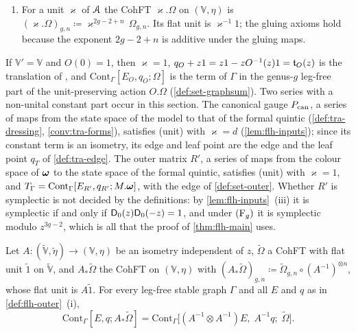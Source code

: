 \begin{defn}
\begin{enumerate}
\[
\text{(unit)}\qquad O_0^{-1}1'=\varkappa^{-1}1\quad\text{for a unit }\varkappa\text{ of }\cA .
\]
The edge and the leaf point of $O$ are
\[
E_O(\psi,\psi')\coloneqq\frac{\eta^{-1}-\bigl(O^{-1}(\psi)\otimes O^{-1}(\psi')\bigr)\eta'^{-1}}{\psi+\psi'},\qquad q_O(z)\coloneqq O^{-1}(z)(-z1'),
\]
where $\eta^{-1}\in\mathbb V\otimes\mathbb V$ and $\eta'^{-1}\in\mathbb V'\otimes\mathbb V'$ are the inverse bivectors. By symplecticity the numerator vanishes at $\psi'=-\psi$, so $E_O$ is a symmetric power series in $\psi,\psi'$ \cite[Rem.~2.1 and (6)]{PPZ15}; by (unit), $q_O\in-z\varkappa^{-1}1+z^2\mathbb V\fps{z}$.
\item For a unit $\varkappa$ of $\mathcal{A}$ the CohFT $\varkappa.\Omega$ on $(\mathbb V,\eta)$ is $(\varkappa.\Omega)_{g,n}\coloneqq\varkappa^{2g-2+n}\,\Omega_{g,n}$. Its flat unit is $\varkappa^{-1}1$; the gluing axioms hold because the exponent $2g-2+n$ is additive under the gluing maps.
\end{enumerate}
\end{defn}

If $\mathbb V'=\mathbb V$ and $O(0)=1$, then $\varkappa=1$, $q_O+z1=z1-zO^{-1}(z)1=\mathfrak{t}_O(z)$ is the translation of \cite[Def.~2.13]{PPZ15}, and $\mathrm{Cont}_\Gamma[E_O,q_O;\Omega]$ is the term of $\Gamma$ in the genus-$g$ leg-free part of the unit-preserving action $O.\Omega$ (\cref{def:set-graphsum}). Two series with a non-unital constant part occur in this section. The canonical gauge $P_{\mathrm{can}}$, a series of maps from the state space of the model to that of the formal quintic (\cref{def:tra-dressing}, \cref{conv:tra-forms}), satisfies (unit) with $\varkappa=d$ (\cref{lem:flh-inputs}); since its constant term is an isometry, its edge and leaf point are the edge and the leaf point $q_T$ of \cref{def:tra-edge}. The outer matrix $R'$, a series of maps from the colour space of $\boldsymbol{\omega}$ to the state space of the formal quintic, satisfies (unit) with $\varkappa=1$, and $T_\Gamma=\mathrm{Cont}_\Gamma[E_{R'},q_{R'};M.\boldsymbol{\omega}]$, with the edge of \cref{def:set-outer}. Whether $R'$ is symplectic is not decided by the definitions: by \cref{lem:flh-inputs}~(iii) it is symplectic if and only if $\mathsf{D}_0(z)\mathsf{D}_0(-z)=1$, and under $(\mathrm{F}_{g})$ it is symplectic modulo $z^{3g-2}$, which is all that the proof of \cref{thm:flh-main} uses.

\begin{lem}
\label{lem:flh-frame}
Let $A\colon(\widetilde{\mathbb V},\tilde\eta)\to(\mathbb V,\eta)$ be an isometry independent of $z$, $\widetilde\Omega$ a CohFT with flat unit $\tilde 1$ on $\widetilde{\mathbb V}$, and $A_*\widetilde\Omega$ the CohFT on $(\mathbb V,\eta)$ with $(A_*\widetilde\Omega)_{g,n}\coloneqq\widetilde\Omega_{g,n}\circ(A^{-1})^{\otimes n}$, whose flat unit is $A\tilde1$. For every leg-free stable graph $\Gamma$ and all $E$ and $q$ as in \cref{def:flh-outer}~(i),
\[
\mathrm{Cont}_\Gamma[E,q;A_*\widetilde\Omega]=\mathrm{Cont}_\Gamma\bigl[(A^{-1}\otimes A^{-1})E,\;A^{-1}q;\;\widetilde\Omega\bigr].
\]
\end{lem}

